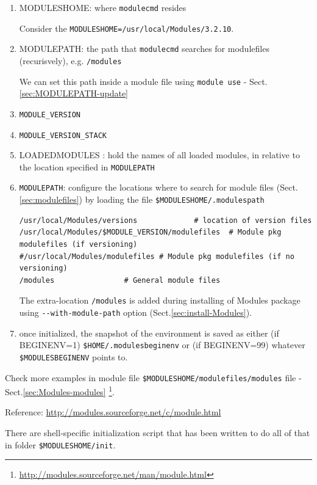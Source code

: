 \begin{enumerate}
  \item MODULESHOME: where \verb!modulecmd! resides

Consider the \verb!MODULESHOME=/usr/local/Modules/3.2.10!.
  
  \item MODULEPATH: the path that \verb!modulecmd! searches for modulefiles
  (recurisvely), e.g. \verb!/modules!
  
We can set this path inside a module file using \verb!module use! -
Sect.\ref{sec:MODULEPATH-update}
  
  \item \verb!MODULE_VERSION!
  
  \item \verb!MODULE_VERSION_STACK!
  
  \item LOADEDMODULES		: hold the names of all loaded modules, in relative to
  the location specified in \verb!MODULEPATH!

  \item \verb!MODULEPATH!: configure the locations where to search for module
  files (Sect.\ref{sec:modulefiles}) by loading the file
  \verb!$MODULESHOME/.modulespath!

\begin{verbatim}
/usr/local/Modules/versions				# location of version files
/usr/local/Modules/$MODULE_VERSION/modulefiles	# Module pkg modulefiles (if versioning)
#/usr/local/Modules/modulefiles	# Module pkg modulefiles (if no versioning)
/modules				# General module files
\end{verbatim}
The extra-location \verb!/modules! is added during installing of Modules package
using \verb!--with-module-path! option (Sect.\ref{sec:install-Modules}).

  \item once initialized, the snapshot of the environment is saved as either (if
  BEGINENV=1) \verb!$HOME/.modulesbeginenv! or (if BEGINENV=99) whatever
  \verb!$MODULESBEGINENV! points to.

\end{enumerate}
Check more examples in module file  \verb!$MODULESHOME/modulefiles/modules! file
- Sect.\ref{sec:Modules-modules}
\footnote{\url{http://modules.sourceforge.net/man/module.html}}.

Reference: \url{http://modules.sourceforge.net/c/module.html}

There are shell-specific initialization script that has been written to do all
of that in folder \verb!$MODULESHOME/init!.  

